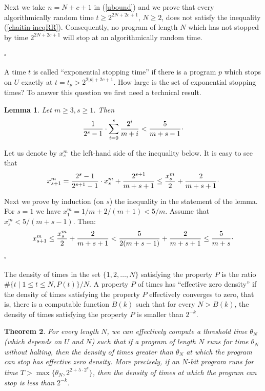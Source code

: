 \documentclass[12pt,twoside,openright]{report}
\newtheorem{thm}{Theorem}
\newcommand{\QED}{\hfill $\square$}
\newtheorem{lem}[thm]{Lemma}
\newcommand{\myproof}{\noindent {\em Proof.}  }
\begin{document}
Next we take  $n=N+c+1$ in (\ref{ubound}) and we  prove  that every algorithmically random time $t \ge 2^{2N+2c+1}$, $N \ge 2$, does not satisfy the inequality (\ref{chaitin-ineqRR}). Consequently, no program of length $N$ which has not stopped by time $2^{2N+2c+1}$ will stop at an  algorithmically random time.

\QED

\medskip

A time $t$ is called ``exponential stopping time'' if there is a program $p$ which stops on $U$ exactly at    $t=t_{p} > 2^{2|p|+2c+1}$.  How large is the set of exponential stopping times?  To answer this question we first need  a technical result.

\medskip

\begin{lem}\label{series}
Let $m \ge 3, s\ge 1$. Then
\[\frac{1}{2^{s}-1}\cdot  \sum_{i=0}^{s} \frac{2^{i}}{m+i} < \frac{5}{m+s-1}\raisebox{0.5ex}.\]
\end{lem} 

\myproof Let us denote by $x_{s}^{m}$ the left-hand side of the inequality below.  It is easy to see that $$ x_{s+1}^{m} = \frac{2^{s}-1}{2^{s+1}-1} \cdot x_{s}^{m} + \frac{2^{s+1}}{m+s+1}\le \frac{x_{s}^{m}}{2} + \frac{2}{m+s+1}
\raisebox{0.5ex}.$$

Next we prove by induction (on $s$) the inequality in the statement of the lemma. For $s=1$ we have $x_{1}^{m} = 1/m + 2/(m+1) < 5/m$. Assume that  $x_{s}^{m}< 5/(m+s-1).$ Then:
\[ x_{s+1}^{m} \le  \frac{x_{s}^{m}}{2} + \frac{2}{m+s+1} < \frac{5}{2(m+s-1)} + \frac{2}{m+s+1}\le \frac{5}{m+s}\raisebox{0.5ex}. \]
\QED

\medskip

The density of times in the set $\{1,2,\ldots ,N\}$ satisfying the property $P$ is the ratio $\#\{ t \mid
1 \le t \le N, P(t)\}/N$. A property $P$ of times has ``effective zero density'' if   the density of times satisfying the property $P$  effectively converges to zero, that is, there is a computable function $B(k)$ such that for every
$N> B(k)$, the density of times satisfying the property $P$ is smaller than $2^{-k}$.


\medskip


\begin{thm}
\label{onestep}
For every length $N$, we can effectively compute a threshold time $\theta_{N}$ (which depends on $U$ and $N$) such that if a program of length $N$ runs for time $\theta_N$  without halting, then the density of times greater than $\theta_N$ at which the program can stop has effective zero density. More precisely, if an $N$-bit program runs for time  $T >\max\{\theta_{N}, 2^{2+5\cdot 2^{k}}\}$, then the density of times at which the program can stop is less than $2^{-k}$.
\end{thm}
\end{document}
